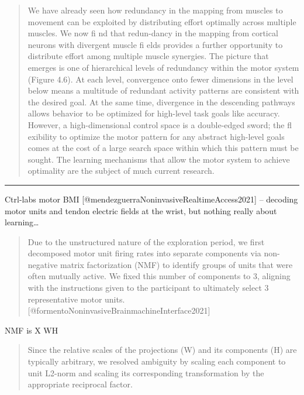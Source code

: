 \documentclass[../main.tex]{subfiles}
\begin{document}
{{{{{{{{{{{\begin{quote}
We have already seen how redundancy in the mapping from muscles to
movement can be exploited by distributing effort optimally across
multiple muscles. We now fi nd that redun-dancy in the mapping from
cortical neurons with divergent muscle fi elds provides a further
opportunity to distribute effort among multiple muscle synergies. The
picture that emerges is one of hierarchical levels of redundancy within
the motor system (Figure 4.6). At each level, convergence onto fewer
dimensions in the level below means a multitude of redundant activity
patterns are consistent with the desired goal. At the same time,
divergence in the descending pathways allows behavior to be optimized
for high-level task goals like accuracy. However, a high-dimensional
control space is a double-edged sword; the fl exibility to optimize the
motor pattern for any abstract high-level goals comes at the cost of a
large search space within which this pattern must be sought. The
learning mechanisms that allow the motor system to achieve optimality
are the subject of much current research.
\end{quote}

\begin{quote}
\end{quote}

\begin{center}\rule{0.5\linewidth}{0.5pt}\end{center}

Ctrl-labs motor BMI {[}@mendezguerraNoninvasiveRealtimeAccess2021{]} --
decoding motor units and tendon electric fields at the wrist, but
nothing really about learning\ldots{}

\begin{quote}
Due to the unstructured nature of the exploration period, we first
decomposed motor unit firing rates into separate components via
non-negative matrix factorization (NMF) to identify groups of units that
were often mutually active. We fixed this number of components to 3,
aligning with the instructions given to the participant to ultimately
select 3 representative motor units.
{[}@formentoNoninvasiveBrainmachineInterface2021{]}
\end{quote}

NMF is X \approx WH

\begin{quote}
Since the relative scales of the projections (W) and its components (H)
are typically arbitrary, we resolved ambiguity by scaling each component
to unit L2-norm and scaling its corresponding transformation by the
appropriate reciprocal factor.
\end{quote}

}}}}}}}}}}}
\end{document}
